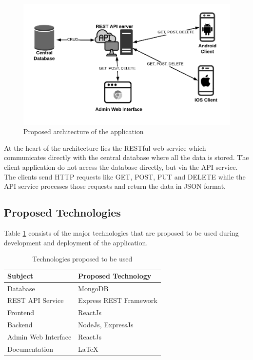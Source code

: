 \documentclass[12pt, a4paper, oneside]{article}
\begin{document}
\begin{figure}[h]
\includegraphics[width=\linewidth]{architecture}
\centering
\caption{Proposed architecture of the application}
\label{fig:arch}
\end{figure}

At the heart of the architecture lies the RESTful web service which communicates directly with the central database where all the data is stored. The client application  do not access the database directly, but via the API service. The clients send HTTP requests like GET, POST, PUT and DELETE while the API service processes those requests and return the data in JSON format. 


\subsection{Proposed Technologies}
Table \ref{table:tech} consists of the major technologies that are proposed to be used during development and deployment of the application.

\renewcommand{\arraystretch}{1.5}
\begin{table}[]
\begin{tabular}{|l|l|}
\hline
\rowcolor[HTML]{C0C0C0} 
\textbf{Subject}    & \textbf{Proposed Technology}   \\ \hline
Database            & MongoDB                       \\ \hline
REST API Service    & Express REST Framework         \\ \hline
Frontend            & ReactJs                        \\ \hline
Backend             & NodeJs, ExpressJs             \\ \hline
Admin Web Interface & ReactJs              \\ \hline
Documentation & LaTeX \\ \hline
\end{tabular}
\caption{Technologies proposed to be used}
\label{table:tech}
\end{table}
\end{document}

